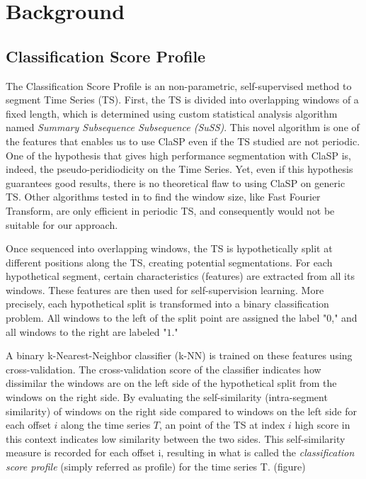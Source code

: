 \documentclass[conference]{IEEEtran}
\begin{document}
\section{Background} \label{Background}

\subsection{Classification Score Profile}

The Classification Score Profile is an non-parametric, self-supervised method to segment Time Series (TS). First, the TS is divided into overlapping windows of a fixed length, which is determined using custom statistical analysis algorithm named \textit{Summary  Subsequence Subsequence (SuSS)}. This novel algorithm is one of the features that enables us to use ClaSP even if the TS studied are not periodic. One of the hypothesis that gives high performance segmentation with ClaSP is, indeed, the pseudo-peridiodicity on the Time Series. Yet, even if this hypothesis guarantees good results, there is no theoretical flaw to using ClaSP on generic TS. Other algorithms tested in \cite{clasp} to find the window size, like Fast Fourier Transform, are only efficient in periodic TS, and consequently would not be suitable for our approach.


Once sequenced into overlapping windows, the TS is hypothetically split at different positions along the TS, creating potential segmentations. For each hypothetical segment, certain characteristics (features) are extracted from all its windows. These features are then used for self-supervision learning.
More precisely, each hypothetical split is transformed into a binary classification problem. All windows to the left of the split point are assigned the label "$0$," and all windows to the right are labeled "$1$."

A binary k-Nearest-Neighbor classifier (k-NN) is trained on these features using cross-validation. The cross-validation score of the classifier indicates how dissimilar the windows are on the left side of the hypothetical split from the windows on the right side. By evaluating the self-similarity (intra-segment similarity) of windows on the right side compared to windows on the left side for each offset $i$ along the time series $T$, an point of the TS at index $i$ high score in this context indicates low similarity between the two sides. This self-similarity measure is recorded for each offset i, resulting in what is called the \textit{classification score profile} (simply referred as profile) for the time series T. (figure)
\end{document}
